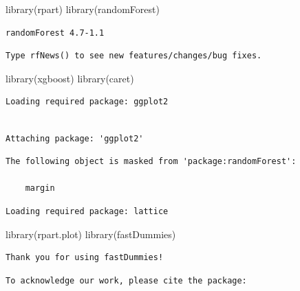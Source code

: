 \documentclass[
  super,
  preprint,
  3p]{elsarticle}
\newenvironment{Shaded}{\begin{snugshade}}{\end{snugshade}}
\newcommand{\FunctionTok}[1]{\textcolor[rgb]{0.28,0.35,0.67}{#1}}
\newcommand{\NormalTok}[1]{\textcolor[rgb]{0.00,0.23,0.31}{#1}}
\begin{document}
\begin{Shaded}
\begin{Highlighting}[]
\FunctionTok{library}\NormalTok{(rpart)}
\FunctionTok{library}\NormalTok{(randomForest)}
\end{Highlighting}
\end{Shaded}

\begin{verbatim}
randomForest 4.7-1.1
\end{verbatim}

\begin{verbatim}
Type rfNews() to see new features/changes/bug fixes.
\end{verbatim}

\begin{Shaded}
\begin{Highlighting}[]
\FunctionTok{library}\NormalTok{(xgboost)}
\FunctionTok{library}\NormalTok{(caret)}
\end{Highlighting}
\end{Shaded}

\begin{verbatim}
Loading required package: ggplot2
\end{verbatim}

\begin{verbatim}

Attaching package: 'ggplot2'
\end{verbatim}

\begin{verbatim}
The following object is masked from 'package:randomForest':

    margin
\end{verbatim}

\begin{verbatim}
Loading required package: lattice
\end{verbatim}

\begin{Shaded}
\begin{Highlighting}[]
\FunctionTok{library}\NormalTok{(rpart.plot)}
\FunctionTok{library}\NormalTok{(fastDummies)}
\end{Highlighting}
\end{Shaded}

\begin{verbatim}
Thank you for using fastDummies!
\end{verbatim}

\begin{verbatim}
To acknowledge our work, please cite the package:
\end{verbatim}
\end{document}
